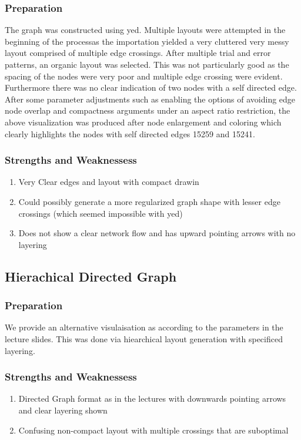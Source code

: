 \documentclass[twoside]{article}
\theoremstyle{definition}
\theoremstyle{definition}
\begin{document}
\subsubsection{Preparation}
The graph was constructed using yed. Multiple layouts were attempted in the beginning of the processas the importation yielded a very cluttered very messy layout comprised of multiple edge crossings.  After multiple trial and error patterns, an organic layout was selected. This was not particularly good as the spacing of the nodes were very poor and multiple edge crossing were evident. Furthermore there was no clear indication of two nodes with a self directed edge. After some parameter adjustments such as enabling the options of avoiding edge node overlap and compactness arguments under an aspect ratio restriction, the above visualization was produced after node enlargement and coloring  which clearly highlights the nodes with self directed edges 15259 and 15241.

\subsubsection{Strengths and Weaknessess}
\begin{enumerate}
	\item Very Clear edges and layout with compact drawin
	\item Could possibly generate a more regularized graph shape with lesser edge crossings (which seemed impossible with yed) 
	\item  Does not show a clear network flow and has upward pointing arrows with no layering
\end{enumerate}

\subsection{Hierachical Directed Graph}
\subsubsection{Preparation}
We provide an alternative visulaisation as according to the parameters in the lecture slides. This was done via hiearchical layout generation with specificed layering. 
\subsubsection{Strengths and Weaknessess}
\begin{enumerate}
	\item Directed Graph format as in the lectures with downwards pointing arrows and clear layering shown 
	\item Confusing non-compact layout with multiple crossings that are suboptimal
\end{enumerate}
\end{document}
